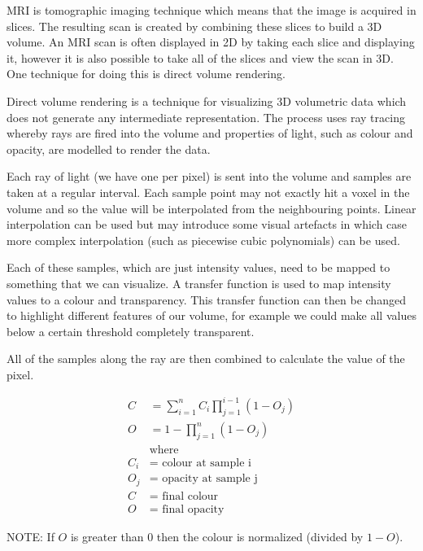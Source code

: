 MRI is tomographic imaging technique which means that the image is acquired in slices. The resulting scan is created by combining these slices to build a 3D volume. An MRI scan is often displayed in 2D by taking each slice and displaying it, however it is also possible to take all of the slices and view the scan in 3D. One technique for doing this is direct volume rendering.

Direct volume rendering is a technique for visualizing 3D volumetric data which does not generate any intermediate representation. The process uses ray tracing whereby rays are fired into the volume and properties of light, such as colour and opacity, are modelled to render the data.

Each ray of light (we have one per pixel) is sent into the volume and samples are taken at a regular interval. Each sample point may not exactly hit a voxel in the volume and so the value will be interpolated from the neighbouring points. Linear interpolation can be used but may introduce some visual artefacts in which case more complex interpolation (such as piecewise cubic polynomials) can be used.

Each of these samples, which are just intensity values, need to be mapped to something that we can visualize. A transfer function is used to map intensity values to a colour and transparency. This transfer function can then be changed to highlight different features of our volume, for example we could make all values below a certain threshold completely transparent.

All of the samples along the ray are then combined to calculate the value of the pixel.

\begin{align*}
	C &= \sum\limits_{i=1}^n C_{i}\prod\limits_{j=1}^{i-1}(1 - O_j) \\
	O &= 1 - \prod\limits_{j=1}^n(1 - O_j) \\
	& \text{where} \\
	C_i &= \text{ colour at sample i} \\
	O_j &= \text{ opacity at sample j} \\
	C &= \text{ final colour} \\
	O &= \text{ final opacity}
\end{align*}

NOTE: If $O$ is greater than 0 then the colour is normalized (divided by $1 - O$).

\newpage
